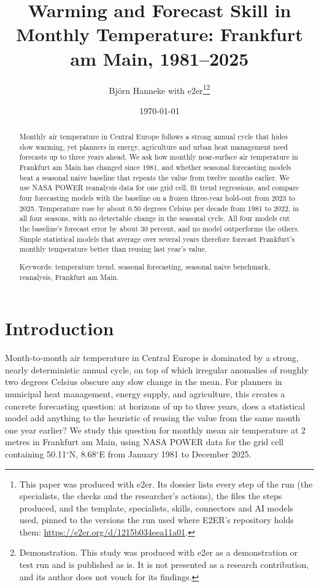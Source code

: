 \documentclass[11pt]{article}
\title{Warming and Forecast Skill in Monthly Temperature: Frankfurt am Main, 1981--2025}
\author{Björn Hanneke with e2er\thanks{This paper was produced with e2er. Its dossier lists every step of the run (the specialists, the checks and the researcher's actions), the files the steps produced, and the template, specialists, skills, connectors and AI models used, pinned to the versions the run used where E2ER's repository holds them: \url{https://e2er.org/d/1215b034eea11a01}.}\thanks{Demonstration. This study was produced with e2er as a demonstration or test run and is published as is. It is not presented as a research contribution, and its author does not vouch for its findings.}}
\date{\today}
\begin{document}
\maketitle

\begin{abstract}
Monthly air temperature in Central Europe follows a strong annual cycle that hides slow warming, yet planners in energy, agriculture and urban heat management need forecasts up to three years ahead. We ask how monthly near-surface air temperature in Frankfurt am Main has changed since 1981, and whether seasonal forecasting models beat a seasonal naive baseline that repeats the value from twelve months earlier. We use NASA POWER reanalysis data for one grid cell, fit trend regressions, and compare four forecasting models with the baseline on a frozen three-year hold-out from 2023 to 2025. Temperature rose by about 0.50 degrees Celsius per decade from 1981 to 2022, in all four seasons, with no detectable change in the seasonal cycle. All four models cut the baseline's forecast error by about 30 percent, and no model outperforms the others. Simple statistical models that average over several years therefore forecast Frankfurt's monthly temperature better than reusing last year's value.

\medskip
\noindent Keywords: temperature trend, seasonal forecasting, seasonal naive benchmark, reanalysis, Frankfurt am Main.
\end{abstract}


\section{Introduction}

Month-to-month air temperature in Central Europe is dominated by a strong, nearly deterministic annual cycle, on top of which irregular anomalies of roughly two degrees Celsius obscure any slow change in the mean. For planners in municipal heat management, energy supply, and agriculture, this creates a concrete forecasting question: at horizons of up to three years, does a statistical model add anything to the heuristic of reusing the value from the same month one year earlier? We study this question for monthly mean air temperature at 2 metres in Frankfurt am Main, using NASA POWER data \citep{NASA_POWER} for the grid cell containing 50.11$^\circ$N, 8.68$^\circ$E from January 1981 to December 2025.
\end{document}
